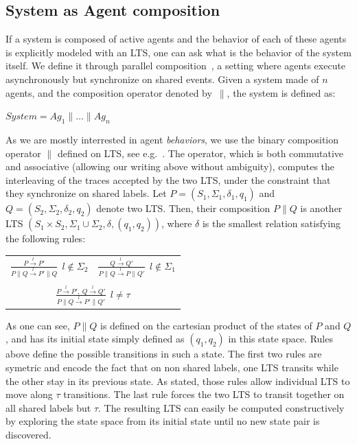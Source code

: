 \subsection{System as Agent composition}

If a system is composed of active agents and the behavior of each of these agents is explicitly modeled with an LTS, one can ask what is the behavior of the system itself. We define it through parallel composition~\cite{Hoare:1985}, a setting where agents execute asynchronously but synchronize on shared events. Given a system made of $n$ agents, and the composition operator denoted by~$\parallel$, the system is defined as:

\begin{center}
$System = Ag_1 \parallel \ldots \parallel Ag_n$ 
\end{center}

As we are mostly interrested in agent \emph{behaviors}, we use the binary composition operator $\parallel$ defined on LTS, see e.g.~\cite{Giannakopoulou:1999, Magee:1999}. The operator, which is both commutative and associative (allowing our writing above without ambiguity), computes the interleaving of the traces accepted by the two LTS, under the constraint that they synchronize on shared labels. Let $P = (S_1,\Sigma_1,\delta_1,q_{1})$ and $Q = (S_2,\Sigma_2,\delta_2,q_{2})$ denote two LTS. Then, their composition $P \parallel Q$ is another LTS $(S_1 \times S_2,\Sigma_1\cup\Sigma_2,\delta,(q_1,q_2))$, where $\delta$ is the smallest relation satisfying the following rules:

\begin{center}
\begin{tabular}{cc}
$\frac{\displaystyle P \stackrel{l}{\longrightarrow} P'}{\displaystyle P \parallel Q \stackrel{l}{\longrightarrow} P' \parallel Q}~~l \notin \Sigma_2$ &
$\frac{\displaystyle Q \stackrel{l}{\longrightarrow} Q'}{\displaystyle P \parallel Q \stackrel{l}{\longrightarrow} P \parallel Q'}~~l \notin \Sigma_1$ \\
 & \\
\multicolumn{2}{c}{$\frac{\displaystyle P \stackrel{l}{\longrightarrow} P',~Q \stackrel{l}{\longrightarrow} Q'}{\displaystyle P \parallel Q \stackrel{l}{\longrightarrow} P' \parallel Q'}~~l \neq \tau$} \\
\end{tabular}
\end{center}

As one can see, $P \parallel Q$ is defined on the cartesian product of the states of $P$ and $Q$, and has its initial state simply defined as $(q_1,q_2)$ in this state space. Rules above define the possible transitions in such a state. The first two rules are symetric and encode the fact that on non shared labels, one LTS transits while the other stay in its previous state. As stated, those rules allow individual LTS to move along $\tau$ transitions. The last rule forces the two LTS to transit together on all shared labels but $\tau$. The resulting LTS can easily be computed constructively by exploring the state space from its initial state until no new state pair is discovered.

